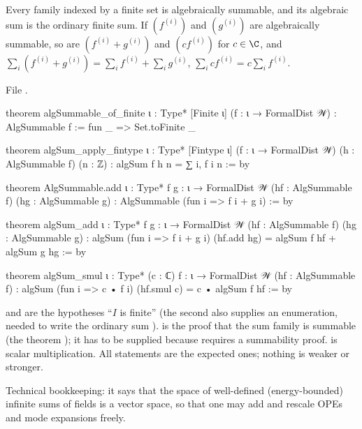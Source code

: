 \begin{proposition}\label{l01:prop:algsum}
Every family indexed by a finite set is algebraically summable, and its algebraic sum is the
ordinary finite sum. If $(f^{(i)})$ and $(g^{(i)})$ are algebraically summable, so are
$(f^{(i)}+g^{(i)})$ and $(c f^{(i)})$ for $c\in\C$, and
$\sum_i (f^{(i)}+g^{(i)}) = \sum_if^{(i)}+\sum_ig^{(i)}$, $\sum_i cf^{(i)} = c\sum_if^{(i)}$.
\end{proposition}

\noindent File .
\begin{leancode}
theorem algSummable_of_finite {ι : Type*} [Finite ι] (f : ι → FormalDist 𝒲) :
    AlgSummable f := fun _ => Set.toFinite _

theorem algSum_apply_fintype {ι : Type*} [Fintype ι] (f : ι → FormalDist 𝒲)
    (h : AlgSummable f) (n : ℤ) : algSum f h n = ∑ i, f i n := by

theorem AlgSummable.add {ι : Type*} {f g : ι → FormalDist 𝒲}
    (hf : AlgSummable f) (hg : AlgSummable g) : AlgSummable (fun i => f i + g i) := by

theorem algSum_add {ι : Type*} {f g : ι → FormalDist 𝒲}
    (hf : AlgSummable f) (hg : AlgSummable g) :
    algSum (fun i => f i + g i) (hf.add hg) = algSum f hf + algSum g hg := by

theorem algSum_smul {ι : Type*} (c : ℂ) {f : ι → FormalDist 𝒲} (hf : AlgSummable f) :
    algSum (fun i => c • f i) (hf.smul c) = c • algSum f hf := by
\end{leancode}

\begin{dictionary}
\lean{[Finite ι]} and \lean{[Fintype ι]} are the hypotheses ``$I$ is finite'' (the second also supplies an
enumeration, needed to write the ordinary sum ).  is the proof that the
sum family is summable (the theorem ); it has to be supplied because 
requires a summability proof.  is scalar multiplication. All statements are the expected
ones; nothing is weaker or stronger.
\end{dictionary}

\begin{physics}
Technical bookkeeping: it says that the space of well-defined (energy-bounded) infinite sums of
fields is a vector space, so that one may add and rescale OPEs and mode expansions freely.
\end{physics}

